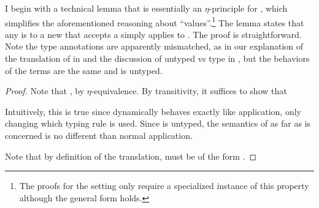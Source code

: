 {
\allowdisplaybreaks %
I begin with a technical lemma that is essentially an \(\eta\)-principle for
 , which simplifies the aforementioned reasoning
about  ``values''.\footnote{The proofs for the  setting only
  require a specialized instance of this property although the general form
  holds.}
The lemma states that any   \im{\se^\div} is
 to a new   that accepts a
 \im{\cpsk} simply applies \im{\se^\div} to \im{\cpsk}.
The proof is straightforward.
Note the type annotations are apparently mismatched, as in our explanation of
the translation of  in  and the discussion
of untyped vs type  in ,
but the behaviors of the terms are the same and  is untyped.
\begin{lemma}
  \label{lem:cps:cbv:break}
    \im{\se^\div \equiv
    \cpsfune{\cpsalpha}{\cpsstarty}{\cpsfune{\cpsk}{\cpsfunty{\cpsA}{\cpsalpha}}{
        \cpscappe{\se^\div}{\cpsalpha}{(\cpsfune{\cpsx}{\cpsB}{\cpsappe{\cpsk}{\cpsx}})}}}}
\end{lemma}
\begin{proof}
  Note that
  \im{\se^\div \equiv
    \cpsfune{\cpsalpha}{\cpsstarty}{\cpsfune{\cpsk}{\cpsfunty{\cpsA}{\cpsalpha}}{
        \cpsncappe{\se^\div}{\cpsalpha}{(\cpsfune{\cpsx}{\cpsB}{\cpsappe{\cpsk}{\cpsx}})}}}}, by
  \(\eta\)-equivalence.
  By transitivity, it suffices to show that

  \im{\cpsfune{\cpsalpha}{\cpsstarty}{\cpsfune{\cpsk}{\cpsfunty{\cpsA}{\cpsalpha}}{
        \cpsncappe{\se^\div}{\cpsalpha}{(\cpsfune{\cpsx}{\cpsB}{\cpsappe{\cpsk}{\cpsx}})}}}
    \equiv
    \cpsfune{\cpsalpha}{\cpsstarty}{\cpsfune{\cpsk}{\cpsfunty{\cpsA}{\cpsalpha}}{
        \cpscappe{\se^\div}{\cpsalpha}{(\cpsfune{\cpsx}{\cpsB}{\cpsappe{\cpsk}{\cpsx}})}}}}

  Intuitively, this is true since  dynamically behaves exactly like
  application, only changing which typing rule is used.
  Since  is untyped, the semantics of  as far
  as  is concerned is no different than normal application.

  Note that by definition of the translation, \im{\se^\div} must be of
  the form \im{\cpsnfune{\cpsalpha}{\cpsnfune{\cpsk}{\cpsepr}}}.


\end{proof}}
